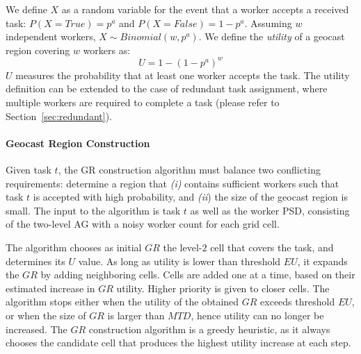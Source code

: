 \documentclass{USC-Thesis}
\numberwithin{equation}{chapter}
\begin{document}
We define $X$ as a random variable for the event that a worker accepts a received task: $\mathit{P(X=True)=p^a}$ and $\mathit{P(X=False)=1-p^a}$. Assuming $w$ independent workers, $\mathit{X\sim Binomial(w,p^a)}$. We define the {\em utility} of a geocast region covering $w$ workers as:
\begin{equation}
\label{eq:utility}
U=1-(1-p^a)^w
\end{equation} 
$U$ measures the probability that at least one worker accepts the task. 
The utility definition can be extended to the case of redundant task assignment, where multiple workers are required to complete a task (please refer to Section~\ref{sec:redundant}).

\paragraph{Geocast Region Construction}
\label{sec:greedy}

Given task $t$, the GR construction algorithm must balance two conflicting requirements: determine a region that {\em (i)} contains sufficient workers such that task $t$ is accepted with high probability, and {\em (ii}) the size of the geocast region is small. The input to the algorithm is task $t$ as well as the worker PSD, consisting of the two-level AG with a noisy worker count for each grid cell.

The algorithm chooses as initial $\mathit{GR}$ the level-$2$ cell that covers the task, and determines its $U$ value. As long as utility is lower than threshold $\mathit{EU}$, it expands the $\mathit{GR}$ by adding neighboring cells. Cells are added one at a time, based on their estimated increase in $\mathit{GR}$ utility. 
Higher priority is given to closer cells. The algorithm stops either when the utility of the obtained $\mathit{GR}$ exceeds threshold $\mathit{EU}$, or when the size of $\mathit{GR}$ is larger than $\mathit{MTD}$, hence utility can no longer be increased. The $\mathit{GR}$ construction algorithm is a greedy heuristic, as it always chooses the candidate cell that produces the highest utility increase at each step.
\end{document}
